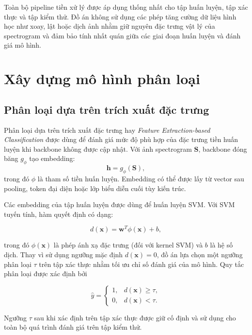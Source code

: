 \documentclass[../DoAn.tex]{subfiles}
\begin{document}
Toàn bộ pipeline tiền xử lý được áp dụng thống nhất cho tập huấn luyện, tập xác thực và tập kiểm thử. Đồ án không sử dụng các phép tăng cường dữ liệu hình học như xoay, lật hoặc dịch ảnh nhằm giữ nguyên đặc trưng vật lý của spectrogram và đảm bảo tính nhất quán giữa các giai đoạn huấn luyện và đánh giá mô hình.



\section{Xây dựng mô hình phân loại}

\subsection{Phân loại dựa trên trích xuất đặc trưng}

Phân loại dựa trên trích xuất đặc trưng hay \textit{Feature Extraction-based Classification} được dùng để đánh giá mức độ phù hợp của đặc trưng tiền huấn luyện khi backbone không được cập nhật. Với ảnh spectrogram $\mathbf{S}$, backbone đóng băng $g_{\phi}$ tạo embedding:
\begin{equation}
    \mathbf{h}=g_{\phi}(\mathbf{S}),
\end{equation}
trong đó $\phi$ là tham số tiền huấn luyện. Embedding có thể được lấy từ vector sau pooling, token đại diện hoặc lớp biểu diễn cuối tùy kiến trúc.

Các embedding của tập huấn luyện được dùng để huấn luyện SVM. Với SVM tuyến tính, hàm quyết định có dạng:

\begin{equation}
d(\mathbf{x})=\mathbf{w}^{T}\phi(\mathbf{x})+b,
\end{equation}

trong đó $\phi(\mathbf{x})$ là phép ánh xạ đặc trưng (đối với kernel SVM) và $b$ là hệ số dịch. Thay vì sử dụng ngưỡng mặc định $d(\mathbf{x})=0$, đồ án lựa chọn một ngưỡng phân loại $\tau$ trên tập xác thực nhằm tối ưu chỉ số đánh giá của mô hình. Quy tắc phân loại được xác định bởi

\begin{equation}
\hat{y}=
\begin{cases}
1, & d(\mathbf{x})\ge\tau,\\
0, & d(\mathbf{x})<\tau.
\end{cases}
\end{equation}

Ngưỡng $\tau$ sau khi xác định trên tập xác thực được giữ cố định và sử dụng cho toàn bộ quá trình đánh giá trên tập kiểm thử.
\end{document}
